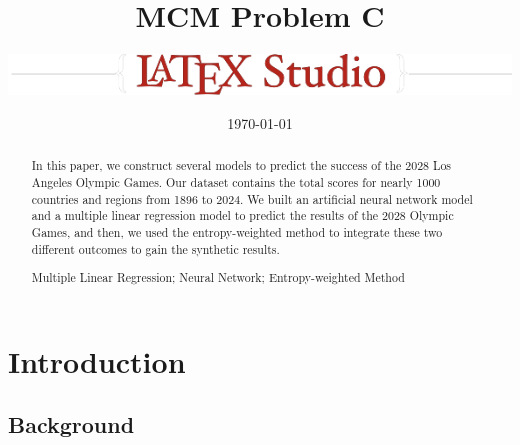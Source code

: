\documentclass{mcmthesis}
\title{MCM Problem C}
\author{\small \href{https://www.latexstudio.net/}
  {\includegraphics{mcmthesis-logo}}}
\date{\today}
\begin{document}
\begin{abstract}
\par %




\begin{Abstract}
In this paper, we construct several models to predict the success of the 2028 Los Angeles Olympic Games. Our dataset contains the total scores for nearly 1000 countries and regions from 1896 to 2024. We built an artificial neural network model and a multiple linear regression model to predict the results of the 2028 Olympic Games, and then, we used the entropy-weighted method to integrate these two different outcomes to gain the synthetic results. 
\end{Abstract}
\begin{keywords}
Multiple Linear Regression; Neural Network; Entropy-weighted Method
\end{keywords}
\end{abstract}
\maketitle
\tableofcontents
\newpage
\section{Introduction}

\subsection{Background}
\end{document}
